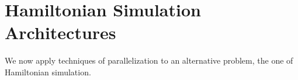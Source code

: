 \chapter{Hamiltonian Simulation Architectures}
\label{chap:hamsim}

We now apply techniques of parallelization to an alternative
problem, the one of Hamiltonian simulation.




